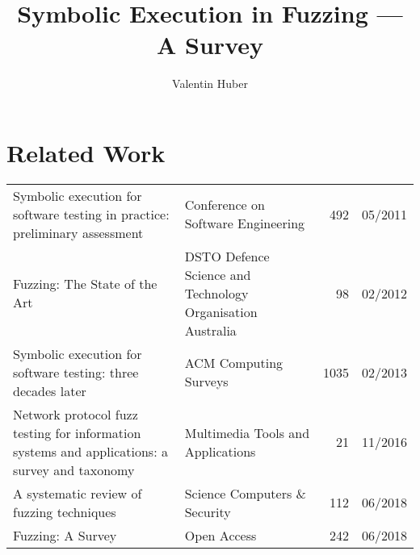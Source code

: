 \documentclass{article}
\title{Symbolic Execution in Fuzzing — A Survey}
\author{Valentin Huber}
\begin{document}


\maketitle
\tableofcontents
\pagebreak

\section{Related Work}
\begin{longtable}{|P{0.44\textwidth}|P{0.32\textwidth}|r|r|}
    \hline
                                                                                                                            &                                              &  &  \\\hline
    \endhead
    Symbolic execution for software testing in practice: preliminary assessment\cite{PreliminaryAssessment}                                       & Conference on Software Engineering                         & 492            & 05/2011       \\\hline
    Fuzzing: The State of the Art\cite{FuzzingTheStateOfTheArt}                                                                                   & DSTO Defence Science and Technology Organisation Australia & 98             & 02/2012       \\\hline
    Symbolic execution for software testing: three decades later\cite{ReviewThreeDecades}                                                         & ACM Computing Surveys                                      & 1035           & 02/2013       \\\hline
    Network protocol fuzz testing for information systems and applications: a survey and taxonomy\cite{Network}                                   & Multimedia Tools and Applications                          & 21             & 11/2016       \\\hline
    A systematic review of fuzzing techniques\cite{Science}                                                                                       & Science Computers \& Security                              & 112            & 06/2018       \\\hline
    Fuzzing: A Survey\cite{FuzzingASurvey}                                                                                                        & Open Access                                                & 242            & 06/2018       \\\hline

\end{longtable}
\end{document}
